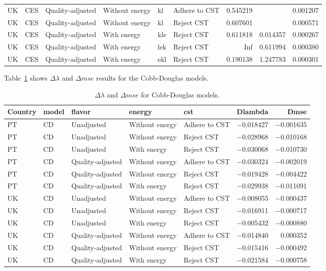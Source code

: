 \documentclass[preprint,authoryear,12pt]{elsarticle}\usepackage[]{graphicx}\usepackage[]{color}
\begin{document}
\begin{table}[ht]
{\begin{tabular}{llllllrrr}
  UK & CES & Quality-adjusted & Without energy & kl & Adhere to CST & 0.545219 &  & 0.001207 \\ 
  UK & CES & Quality-adjusted & Without energy & kl & Reject CST & 0.607601 &  & 0.000571 \\ 
  UK & CES & Quality-adjusted & With energy & kle & Reject CST & 0.611818 & 0.014357 & 0.000267 \\ 
  UK & CES & Quality-adjusted & With energy & lek & Reject CST &     Inf & 0.611994 & 0.000380 \\ 
  UK & CES & Quality-adjusted & With energy & ekl & Reject CST & 0.190138 & 1.247783 & 0.000301 \\ 
   \hline
\end{tabular}
}
\end{table}

%
Table~\ref{tab:DSRmse_CD} shows $\Delta \lambda$ and $\Delta mse$ results for the Cobb-Douglas models.
%
\begin{table}[ht]
\centering
\caption{$\Delta \lambda$ and $\Delta mse$ for Cobb-Douglas models.} 
\label{tab:DSRmse_CD}
{\tiny
\begin{tabular}{lllllrr}
  \hline
Country & model & flavor & energy & cst & Dlambda & Dmse \\ 
  \hline
PT & CD & Unadjusted & Without energy & Adhere to CST & $-$0.018427 & $-$0.001635 \\ 
  PT & CD & Unadjusted & Without energy & Reject CST & $-$0.028968 & $-$0.010168 \\ 
  PT & CD & Unadjusted & With energy & Reject CST & $-$0.030068 & $-$0.010730 \\ 
  PT & CD & Quality-adjusted & Without energy & Adhere to CST & $-$0.030324 & $-$0.002019 \\ 
  PT & CD & Quality-adjusted & Without energy & Reject CST & $-$0.019428 & $-$0.004422 \\ 
  PT & CD & Quality-adjusted & With energy & Reject CST & $-$0.029938 & $-$0.011091 \\ 
  UK & CD & Unadjusted & Without energy & Adhere to CST & $-$0.008055 & $-$0.000437 \\ 
  UK & CD & Unadjusted & Without energy & Reject CST & $-$0.016911 & $-$0.000717 \\ 
  UK & CD & Unadjusted & With energy & Reject CST & $-$0.005432 & $-$0.000880 \\ 
  UK & CD & Quality-adjusted & Without energy & Adhere to CST & $-$0.014840 & 0.000352 \\ 
  UK & CD & Quality-adjusted & Without energy & Reject CST & $-$0.015416 & $-$0.000492 \\ 
  UK & CD & Quality-adjusted & With energy & Reject CST & $-$0.021584 & $-$0.000758 \\ 
   \hline
\end{tabular}
}
\end{table}
\end{document}
